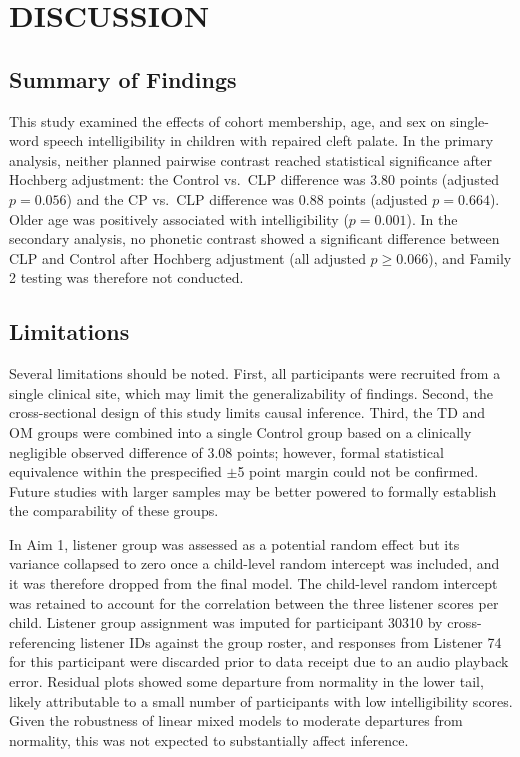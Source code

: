 \documentclass[11pt]{article}
\begin{document}
\section*{DISCUSSION}\label{sec:discussion}
\subsection*{Summary of Findings}
This study examined the effects of cohort membership, age, and sex on
single-word speech intelligibility in children with repaired cleft palate.
In the primary analysis, neither planned
pairwise contrast reached statistical significance after Hochberg adjustment:
the Control vs.\ CLP difference was 3.80 points (adjusted $p = 0.056$) and
the CP vs.\ CLP difference was 0.88 points (adjusted $p = 0.664$). Older age
was positively associated with intelligibility ($p = 0.001$). In the secondary
analysis, no phonetic contrast showed a significant difference between CLP and
Control after Hochberg adjustment (all adjusted $p \geq 0.066$), and Family 2
testing was therefore not conducted.

\subsection*{Limitations}
Several limitations should be noted. First, all participants were recruited
from a single clinical site, which may limit the generalizability of findings.
Second, the cross-sectional design of this study limits causal inference.
Third, the TD and OM groups were combined into a single Control group based on
a clinically negligible observed difference of 3.08 points; however, formal
statistical equivalence within the prespecified $\pm$5 point margin could not
be confirmed. Future studies with larger samples may be better powered to
formally establish the comparability of these groups.

In Aim 1, listener group was assessed as a potential random effect but its variance collapsed to zero once a child-level random intercept was included, and it was therefore dropped from the final model. The child-level random intercept was retained to account for the correlation between the three listener scores per child. Listener group assignment was imputed for participant 30310 by cross-referencing listener IDs against the group roster, and responses from Listener 74 for this participant were discarded prior to data receipt due to an audio playback error. Residual plots showed some departure from normality in the lower tail, likely attributable to a small number of participants with low intelligibility scores. Given the robustness of linear mixed models to moderate departures from normality, this was not expected to substantially affect inference.
\end{document}
